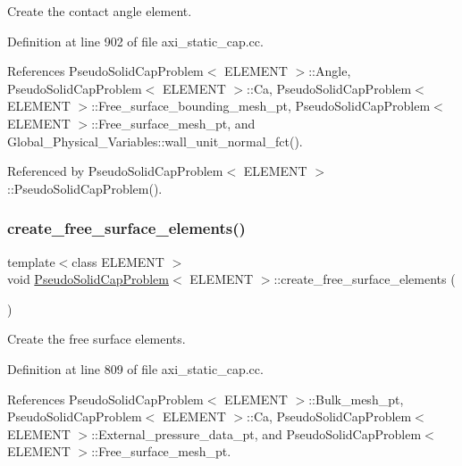 Create the contact angle element. 



Definition at line 902 of file axi\+\_\+static\+\_\+cap.\+cc.



References Pseudo\+Solid\+Cap\+Problem$<$ E\+L\+E\+M\+E\+N\+T $>$\+::\+Angle, Pseudo\+Solid\+Cap\+Problem$<$ E\+L\+E\+M\+E\+N\+T $>$\+::\+Ca, Pseudo\+Solid\+Cap\+Problem$<$ E\+L\+E\+M\+E\+N\+T $>$\+::\+Free\+\_\+surface\+\_\+bounding\+\_\+mesh\+\_\+pt, Pseudo\+Solid\+Cap\+Problem$<$ E\+L\+E\+M\+E\+N\+T $>$\+::\+Free\+\_\+surface\+\_\+mesh\+\_\+pt, and Global\+\_\+\+Physical\+\_\+\+Variables\+::wall\+\_\+unit\+\_\+normal\+\_\+fct().



Referenced by Pseudo\+Solid\+Cap\+Problem$<$ E\+L\+E\+M\+E\+N\+T $>$\+::\+Pseudo\+Solid\+Cap\+Problem().

\mbox{\label{classPseudoSolidCapProblem_ac0219ed64385dc20c4fc3c6cc217fd67}} 
\subsubsection{\texorpdfstring{create\+\_\+free\+\_\+surface\+\_\+elements()}{create\_free\_surface\_elements()}}
{\footnotesize\ttfamily template$<$class E\+L\+E\+M\+E\+NT $>$ \\
void \hyperlink{classPseudoSolidCapProblem}{Pseudo\+Solid\+Cap\+Problem}$<$ E\+L\+E\+M\+E\+NT $>$\+::create\+\_\+free\+\_\+surface\+\_\+elements (\begin{DoxyParamCaption}{ }\end{DoxyParamCaption})\hspace{0.3cm}{\ttfamily [private]}}



Create the free surface elements. 



Definition at line 809 of file axi\+\_\+static\+\_\+cap.\+cc.



References Pseudo\+Solid\+Cap\+Problem$<$ E\+L\+E\+M\+E\+N\+T $>$\+::\+Bulk\+\_\+mesh\+\_\+pt, Pseudo\+Solid\+Cap\+Problem$<$ E\+L\+E\+M\+E\+N\+T $>$\+::\+Ca, Pseudo\+Solid\+Cap\+Problem$<$ E\+L\+E\+M\+E\+N\+T $>$\+::\+External\+\_\+pressure\+\_\+data\+\_\+pt, and Pseudo\+Solid\+Cap\+Problem$<$ E\+L\+E\+M\+E\+N\+T $>$\+::\+Free\+\_\+surface\+\_\+mesh\+\_\+pt.



